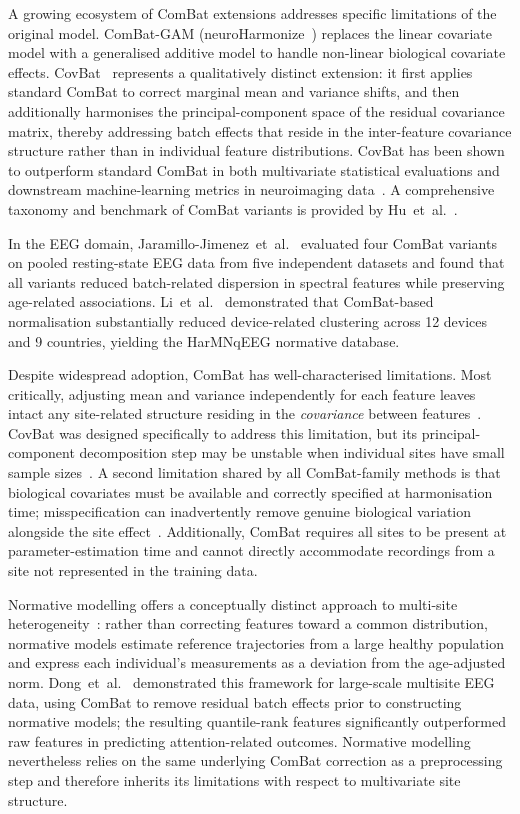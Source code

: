 \documentclass[preprint,12pt]{elsarticle}
\begin{document}
A growing ecosystem of ComBat extensions addresses specific
limitations of the original model.
ComBat-GAM (neuroHarmonize~\cite{pomponio2020harmonization}) replaces
the linear covariate model with a generalised additive model to
handle non-linear biological covariate effects.
CovBat~\cite{hu2023image} represents a qualitatively distinct
extension: it first applies standard ComBat to correct marginal mean
and variance shifts, and then additionally harmonises the
principal-component space of the residual covariance matrix, thereby
addressing batch effects that reside in the inter-feature covariance
structure rather than in individual feature distributions.
CovBat has been shown to outperform standard ComBat in both
multivariate statistical evaluations and downstream machine-learning
metrics in neuroimaging data~\cite{hu2023image}.
A comprehensive taxonomy and benchmark of ComBat variants is provided
by Hu~et~al.~\cite{hu2023image}.

In the EEG domain, Jaramillo-Jimenez~et~al.~\cite{jaramillo2024combat}
evaluated four ComBat variants on pooled resting-state EEG data from
five independent datasets and found that all variants reduced
batch-related dispersion in spectral features while preserving
age-related associations.
Li~et~al.~\cite{li2022harmnqeeg} demonstrated that ComBat-based
normalisation substantially reduced device-related clustering across
12 devices and 9 countries, yielding the HarMNqEEG normative database.

Despite widespread adoption, ComBat has well-characterised
limitations.
Most critically, adjusting mean and variance independently for each
feature leaves intact any site-related structure residing in the
\emph{covariance} between features~\cite{hu2023image}.
CovBat was designed specifically to address this limitation, but
its principal-component decomposition step may be unstable when
individual sites have small sample sizes~\cite{hu2023image}.
A second limitation shared by all ComBat-family methods is that
biological covariates must be available and correctly specified at
harmonisation time; misspecification can inadvertently remove genuine
biological variation alongside the site
effect~\cite{hu2023image,fortin2017harmonization}.
Additionally, ComBat requires all sites to be present at
parameter-estimation time and cannot directly accommodate recordings
from a site not represented in the training data.

Normative modelling offers a conceptually distinct approach to
multi-site heterogeneity~\cite{dong2025normative}: rather than
correcting features toward a common distribution, normative models
estimate reference trajectories from a large healthy population and
express each individual's measurements as a deviation from the
age-adjusted norm.
Dong~et~al.~\cite{dong2025normative} demonstrated this framework for
large-scale multisite EEG data, using ComBat to remove residual batch
effects prior to constructing normative models; the resulting
quantile-rank features significantly outperformed raw features in
predicting attention-related outcomes.
Normative modelling nevertheless relies on the same underlying ComBat
correction as a preprocessing step and therefore inherits its
limitations with respect to multivariate site structure.
\end{document}
